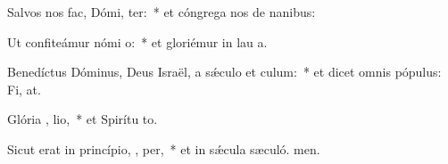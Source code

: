 \item Salvos nos fac, Dómi,  ter:~* et cóngrega nos de nanibus:
\item Ut confiteámur nómi  o:~* et gloriémur in lau a.
\item Benedíctus Dóminus, Deus Israël, a sǽculo et   culum:~* et dicet omnis pópulus: Fi, at.
\item Glória ,  lio,~* et Spirítu to.
\item Sicut erat in princípio,  ,  per,~* et in sǽcula sæculó. men.
